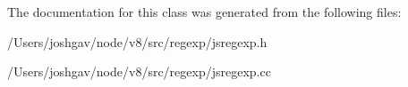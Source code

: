 The documentation for this class was generated from the following files\+:\begin{DoxyCompactItemize}
\item 
/\+Users/joshgav/node/v8/src/regexp/jsregexp.\+h\item 
/\+Users/joshgav/node/v8/src/regexp/jsregexp.\+cc\end{DoxyCompactItemize}
